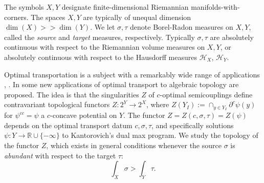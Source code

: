 \documentclass[12pt]{amsart}
\theoremstyle{definition}
\theoremstyle{remark}
\newcommand{\bR}{\mathbb{R}}
\newcommand{\del}{\partial}
\newcommand{\ysub}{\del^c \psi(y)}
\begin{document}
The symbols $X,Y$ designate finite-dimensional Riemannian manifolds-with-corners. The spaces $X,Y$ are typically of unequal dimension $\dim(X) >> \dim(Y)$. We let $\sigma, \tau$ denote Borel-Radon measures on $X,Y$, called the \emph{source} and \emph{target} measures, respectively. Typically $\sigma, \tau$ are absolutely continuous with respect to the Riemannian volume measures on $X,Y$, or absolutely continuous with respect to the Hausdorff measures $\mathscr{H}_X$, $\mathscr{H}_Y$. 
%

Optimal transportation is a subject with a remarkably wide range of applications \cite{Vil1}, \cite{Vil2}. In \cite{martel} some new applications of optimal transport to algebraic topology are proposed. The idea is that the singularities $Z$ of $c$-optimal semicouplings define contravariant topological functors $Z: 2^Y \to 2^X$, where $Z(Y_I):=\cap_{y\in Y_I} \ysub$ for $\psi^{cc}=\psi$ a $c$-concave potential on $Y$. The functor $Z=Z(c,\sigma, \tau)=Z(\psi)$ depends on the optimal transport datum $c, \sigma, \tau$, and specifically solutions $\psi: Y \to \bR \cup \{-\infty\}$ to Kantorovich's dual max program. We study the topology of the functor $Z$, which exists in general conditions whenever the source $\sigma$ is \emph{abundant} with respect to the target $\tau$:  \begin{equation}\label{abundant}\int_X \sigma > \int_Y \tau. \end{equation} 
\end{document}
